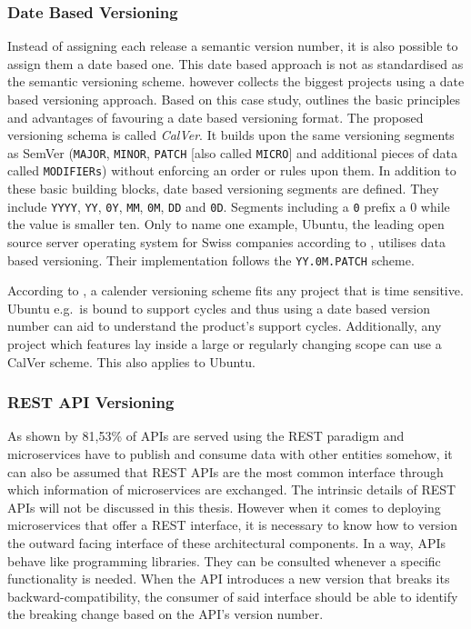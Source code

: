\subsubsection{Date Based Versioning}%
\label{ssub:Date_Based_Versioning}
Instead of assigning each release a semantic version number, it is also
possible to assign them a date based one. This date based approach is not as
standardised as the semantic versioning scheme.
\autocite{HashemiCalendarVersioning2017} however collects the biggest projects
using a date based versioning approach. Based on this case study,
\autocite{HashemiCalendarVersioning2017} outlines the basic principles and
advantages of favouring a date based versioning format. The proposed versioning
schema is called \textit{CalVer}. It builds upon the same versioning segments
as SemVer (\texttt{MAJOR}, \texttt{MINOR}, \texttt{PATCH} [also called
\texttt{MICRO}] and additional pieces of data called \texttt{MODIFIERs})
without enforcing an order or rules upon them. In addition to these basic
building blocks, date based versioning segments are defined. They include
\texttt{YYYY}, \texttt{YY}, \texttt{0Y}, \texttt{MM}, \texttt{0M}, \texttt{DD}
and \texttt{0D}. Segments including a \texttt{0} prefix a 0 while the value is
smaller ten. Only to name one example, Ubuntu, the leading open source server
operating system for Swiss companies according to
\autocite{SwissICTWelcheOpenSource2018}, utilises data based versioning. Their
implementation follows the \texttt{YY.0M.PATCH} scheme.

According to \autocite{HashemiCalendarVersioning2017}, a calender versioning
scheme fits any project that is time sensitive. Ubuntu e.g.\ is bound to
support cycles and thus using a date based version number can aid to understand
the product's support cycles. Additionally, any project which features lay
inside a large or regularly changing scope can use a CalVer scheme. This also
applies to Ubuntu.

\subsubsection{REST API Versioning}%
\label{ssub:API_Versioning}
As shown by \autocite{SantosWhichAPITypes2017} 81,53\% of \acp{API} are
served using the \ac{REST} paradigm and microservices have to publish and
consume data with other entities somehow, it can also be assumed that \ac{REST}
\acp{API} are the most common interface through which information of
microservices are exchanged. The intrinsic details of \ac{REST} \acp{API} will
not be discussed in this thesis. However when it comes to deploying
microservices that offer a \ac{REST} interface, it is necessary to know how to
version the outward facing interface of these architectural components. In a
way, \acp{API} behave like programming libraries. They can be consulted
whenever a specific functionality is needed. When the \ac{API} introduces a new
version that breaks its backward-compatibility, the consumer of said interface
should be able to identify the breaking change based on the \ac{API}'s version
number.

